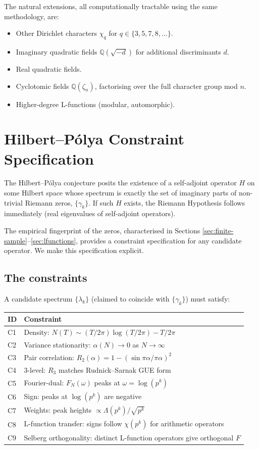 \documentclass[11pt,a4paper]{article}
\theoremstyle{plain}
\theoremstyle{definition}
\theoremstyle{remark}
\begin{document}
The natural extensions, all computationally tractable using the same
methodology, are:
\begin{itemize}
\item Other Dirichlet characters $\chi_q$ for $q \in \{3, 5, 7, 8, \ldots\}$.
\item Imaginary quadratic fields $\mathbb{Q}(\sqrt{-d})$ for additional
discriminants $d$.
\item Real quadratic fields.
\item Cyclotomic fields $\mathbb{Q}(\zeta_n)$, factorising over the full
character group mod $n$.
\item Higher-degree L-functions (modular, automorphic).
\end{itemize}


\section{Hilbert--Pólya Constraint Specification}
\label{sec:hilbert-polya}

The Hilbert--Pólya conjecture posits the existence of a self-adjoint
operator $H$ on some Hilbert space whose spectrum is exactly the set
of imaginary parts of non-trivial Riemann zeros, $\{\gamma_k\}$. If
such $H$ exists, the Riemann Hypothesis follows immediately (real
eigenvalues of self-adjoint operators).

The empirical fingerprint of the zeros, characterised in Sections
\ref{sec:finite-sample}--\ref{sec:lfunctions}, provides a constraint
specification for any candidate operator. We make this specification
explicit.

\subsection{The constraints}
\label{sec:hp-constraints}

A candidate spectrum $\{\lambda_k\}$ (claimed to coincide with
$\{\gamma_k\}$) must satisfy:

\begin{center}
\begin{tabular}{ll}
\toprule
ID & Constraint \\
\midrule
C1 & Density: $N(T) \sim (T/2\pi)\log(T/2\pi) - T/2\pi$ \\
C2 & Variance stationarity: $\alpha(N) \to 0$ as $N \to \infty$ \\
C3 & Pair correlation: $R_2(\alpha) = 1 - (\sin \pi\alpha/\pi\alpha)^2$ \\
C4 & 3-level: $R_3$ matches Rudnick--Sarnak GUE form \\
C5 & Fourier-dual: $F_N(\omega)$ peaks at $\omega = \log(p^k)$ \\
C6 & Sign: peaks at $\log(p^k)$ are negative \\
C7 & Weights: peak heights $\propto \Lambda(p^k)/\sqrt{p^k}$ \\
C8 & L-function transfer: signs follow $\chi(p^k)$ for arithmetic operators \\
C9 & Selberg orthogonality: distinct L-function operators give orthogonal $F$ \\
\bottomrule
\end{tabular}
\end{center}
\end{document}
